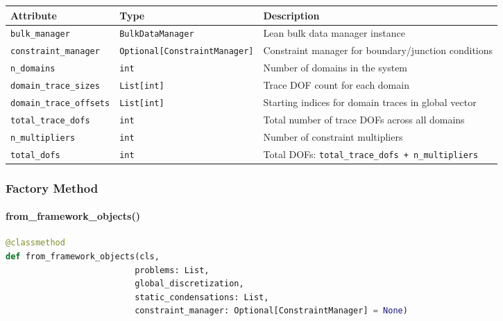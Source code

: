 \begin{longtable}{|p{3.5cm}|p{2.5cm}|p{7cm}|}
\hline
\textbf{Attribute} & \textbf{Type} & \textbf{Description} \\
\hline
\endhead

\texttt{bulk\_manager} & \texttt{BulkDataManager} & Lean bulk data manager instance \\
\hline

\texttt{constraint\_manager} & \texttt{Optional[ConstraintManager]} & Constraint manager for boundary/junction conditions \\
\hline

\texttt{n\_domains} & \texttt{int} & Number of domains in the system \\
\hline

\texttt{domain\_trace\_sizes} & \texttt{List[int]} & Trace DOF count for each domain \\
\hline

\texttt{domain\_trace\_offsets} & \texttt{List[int]} & Starting indices for domain traces in global vector \\
\hline

\texttt{total\_trace\_dofs} & \texttt{int} & Total number of trace DOFs across all domains \\
\hline

\texttt{n\_multipliers} & \texttt{int} & Number of constraint multipliers \\
\hline

\texttt{total\_dofs} & \texttt{int} & Total DOFs: \texttt{total\_trace\_dofs + n\_multipliers} \\
\hline

\end{longtable}

\subsubsection{Factory Method}

\paragraph{from\_framework\_objects()}\leavevmode
\begin{lstlisting}[language=Python, caption=Factory Method]
@classmethod
def from_framework_objects(cls,
                          problems: List,
                          global_discretization,
                          static_condensations: List,
                          constraint_manager: Optional[ConstraintManager] = None)
\end{lstlisting}

